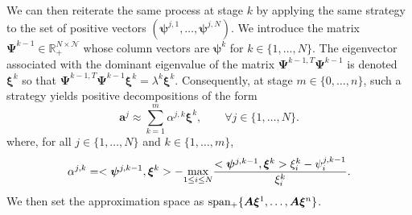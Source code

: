\documentclass[12pt,a4paper]{article}
\newcommand{\calN}{\mathcal N}
\newcommand{\R}{\mathbb R}
\begin{document}
		We can then reiterate the same process at stage $k$ by applying the same strategy to the set of positive vectors 
$(\bm\psi^{j,1},\ldots,\bm\psi^{j,N})$.
We introduce the matrix $\bm\Psi^{k-1}\in\R_+^{N\times\calN}$ whose column vectors are $\bm\psi^k$ for $k\in\{1,\ldots,N\}$.
The eigenvector associated with the dominant eigenvalue of the matrix $\bm\Psi^{k-1,T}\bm\Psi^{k-1}$ is denoted $\bm\xi^k$ so that $\bm\Psi^{k-1,T}\bm\Psi^{k-1}\bm\xi^k = \lambda^k\bm\xi^k$.
Consequently, at stage $m\in\{0,\ldots,n\}$, such a strategy yields positive decompositions of the form
\begin{equation}\label{eq:stage_m_pos_dec}
		\bm a^j \approx \sum_{k=1}^m \alpha^{j,k}\bm \xi^k,\qquad \forall j\in\{1,\ldots,N\}.
\end{equation}
where, for all $j\in\{1,\ldots,N\}$ and $k\in \{1,\ldots, m\}$,
\begin{equation}
	\alpha^{j,k} = <\bm \psi^{j,k-1}, \bm \xi^k> - \underset{1\leq i\leq N}{\rm max}\frac{<\bm \psi^{j,k-1}, \bm \xi^k>\xi^k_i -  \psi^{j,k-1}_i}{\xi^k_i}.
\end{equation}
We then set the approximation space as ${\rm span_+}\{\bm A\bm\xi^1,\ldots,\bm A\bm\xi^n\}$.
\end{document}
